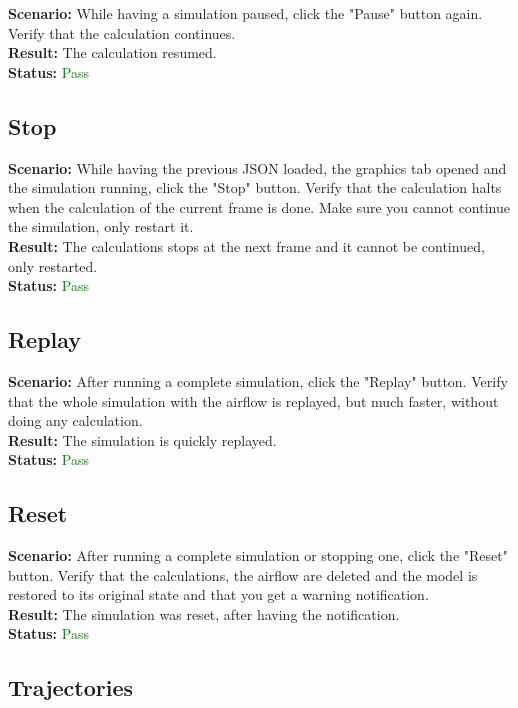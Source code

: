 \documentclass[a4paper, 11pt, article]{report}
\begin{document}
\noindent \textbf{Scenario:} While having a simulation paused, click the "Pause" button again. Verify that the calculation continues.
\\
\noindent \textbf{Result:} The calculation resumed.
\\
\noindent \textbf{Status:} \textcolor{green}{Pass}

\subsection{Stop}

\noindent \textbf{Scenario:} While having the previous JSON loaded, the graphics tab opened and the simulation running, click the "Stop" button. Verify that the calculation halts when the calculation of the current frame is done. Make sure you cannot continue the simulation, only restart it.
\\
\noindent \textbf{Result:} The calculations stops at the next frame and it cannot be continued, only restarted.
\\
\noindent \textbf{Status:} \textcolor{green}{Pass}

\subsection{Replay}

\noindent \textbf{Scenario:} After running a complete simulation, click the "Replay" button. Verify that the whole simulation with the airflow is replayed, but much faster, without doing any calculation.
\\
\noindent \textbf{Result:} The simulation is quickly replayed.
\\
\noindent \textbf{Status:} \textcolor{green}{Pass}

\subsection{Reset}

\noindent \textbf{Scenario:} After running a complete simulation or stopping one, click the "Reset" button. Verify that the calculations, the airflow are deleted and the model is restored to its original state and that you get a warning notification.
\\
\noindent \textbf{Result:} The simulation was reset, after having the notification.
\\
\noindent \textbf{Status:} \textcolor{green}{Pass}

\subsection{Trajectories}
\end{document}
